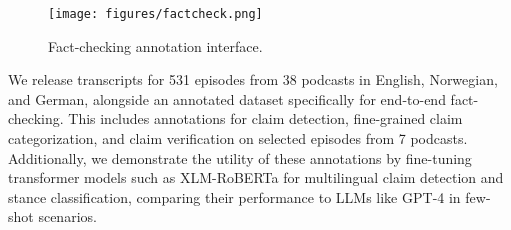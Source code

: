 \begin{figure}
    \centering
    \texttt{[image: figures/factcheck.png]}
    \caption{Fact-checking annotation interface.}
    \label{fig:stance}
\end{figure}

We release transcripts for 531 episodes from 38 podcasts in English, Norwegian, and German, alongside an annotated dataset specifically for end-to-end fact-checking. This includes annotations for claim detection, fine-grained claim categorization, and claim verification on selected episodes from 7 podcasts. Additionally, we demonstrate the utility of these annotations by fine-tuning transformer models such as XLM-RoBERTa for multilingual claim detection and stance classification, comparing their performance to LLMs like GPT-4 in few-shot scenarios.



